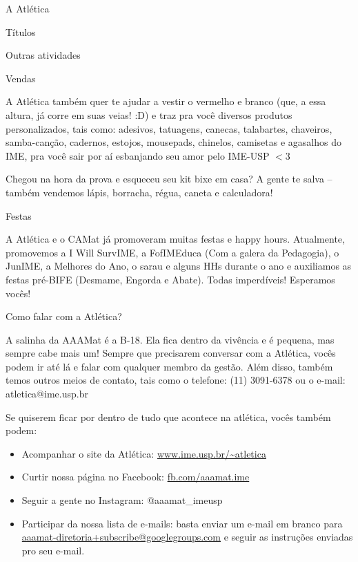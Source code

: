 \begin{secao}{A Atlética}
\begin{subsecao}{Títulos}
\end{subsecao}
\begin{subsecao}{Outras atividades}

\begin{subsubsecao}{Vendas}

A Atlética também quer te ajudar a vestir o vermelho e branco (que, a essa
altura, já corre em suas veias! :D) e traz pra você diversos produtos
personalizados, tais como: adesivos, tatuagens, canecas, talabartes, chaveiros,
samba-canção, cadernos, estojos, mousepads, chinelos, camisetas e agasalhos do
IME, pra você sair por aí esbanjando seu amor pelo IME-USP $<$3

Chegou na hora da prova e esqueceu seu kit bixe em casa? A gente te salva --
também vendemos lápis, borracha, régua, caneta e calculadora!

\end{subsubsecao}
\begin{subsubsecao}{Festas}

A Atlética e o CAMat já promoveram muitas festas e happy hours. Atualmente,
promovemos a I Will SurvIME, a FofIMEduca (Com a galera da Pedagogia), o 
JunIME, a Melhores do Ano, o sarau e alguns HHs durante o ano e auxiliamos 
as festas pré-BIFE (Desmame, Engorda e Abate). Todas imperdíveis!
Esperamos vocês!

\end{subsubsecao}
\begin{subsubsecao}{Como falar com a Atlética?}

A salinha da AAAMat é a B-18. Ela fica dentro da vivência e é pequena, mas
sempre cabe mais um! Sempre que precisarem conversar com a Atlética, vocês
podem ir até lá e falar com qualquer membro da gestão. Além disso, também temos
outros meios de contato, tais como o telefone: (11) 3091-6378 ou o e-mail:
atletica@ime.usp.br

Se quiserem ficar por dentro de tudo que acontece na atlética, vocês também
podem:

\begin{itemize}
  \item Acompanhar o site da Atlética: \url{www.ime.usp.br/~atletica}
  \item Curtir nossa página no Facebook: \url{fb.com/aaamat.ime}
  \item Seguir a gente no Instagram: @aaamat\_imeusp
  \item Participar da nossa lista de e-mails: basta enviar um e-mail em branco
        para \url{aaamat-diretoria+subscribe@googlegroups.com} e seguir as
        instruções enviadas pro seu e-mail.
\end{itemize}


\end{subsubsecao}
\end{subsecao}
\end{secao}
